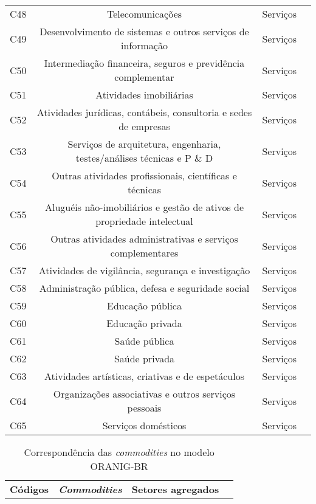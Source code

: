 \begin{apendicesenv}
\begin{small}
\begin{center}
\begin{longtable}{lccc}
				C48 & Telecomunicações & Serviços \\
				C49 & Desenvolvimento de sistemas e outros serviços de informação & Serviços \\
				C50 & Intermediação financeira, seguros e previdência complementar & Serviços \\
				C51 & Atividades imobiliárias & Serviços \\
				C52 & Atividades jurídicas, contábeis, consultoria e sedes de empresas & Serviços \\
				C53 & Serviços de arquitetura, engenharia, testes/análises técnicas e P \& D & Serviços \\
				C54 & Outras atividades profissionais, científicas e técnicas & Serviços \\
				C55 & Aluguéis não-imobiliários e gestão de ativos de propriedade intelectual & Serviços \\
				C56 & Outras atividades administrativas e serviços complementares & Serviços \\
				C57 & Atividades de vigilância, segurança e investigação & Serviços \\
				C58 & Administração pública, defesa e seguridade social & Serviços \\
				C59 & Educação pública & Serviços \\
				C60 & Educação privada & Serviços \\
				C61 & Saúde pública & Serviços \\
				C62 & Saúde privada & Serviços \\
				C63 & Atividades artísticas, criativas e de espetáculos & Serviços \\
				C64 & Organizações associativas e outros serviços pessoais & Serviços \\
				C65 & Serviços domésticos & Serviços \\ \hline
			\end{longtable}
		\end{center}
	\end{small}

	\newpage

	\begin{small}
		\begin{center}
			\begin{longtable}{lccc}
				\caption{Correspondência das \textit{commodities} no modelo ORANIG-BR}\label{ap:commodities} \\
				
				\hline
				\multirow{2}{*}{\textbf{Códigos}} & \multirow{2}{*}{\textbf{\textit{Commodities}}} & \multirow{2}{*}{\textbf{Setores agregados}} \\
				&  &  \\ \hline \endfirsthead


\end{longtable}
\end{center}
\end{small}
\end{apendicesenv}
